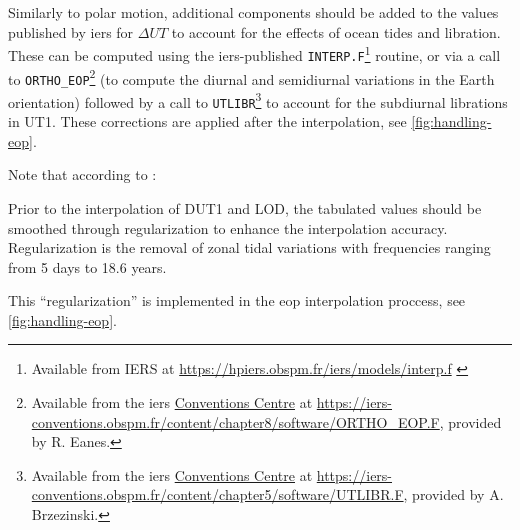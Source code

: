 Similarly to polar motion, additional components should 
be added to the values published by \gls{iers} for $\Delta UT$ to account for 
the effects of ocean tides and libration. These can be computed using the 
\gls{iers}-published \texttt{INTERP.F}\footnote{Available from IERS at \url{https://hpiers.obspm.fr/iers/models/interp.f} \label{fn:interp-f}} 
routine, or via a call to \texttt{ORTHO\_EOP}\footnote{Available from the \gls{iers} \href{https://iers-conventions.obspm.fr/}{Conventions Centre} at \url{https://iers-conventions.obspm.fr/content/chapter8/software/ORTHO_EOP.F}, provided by R. Eanes.} 
(to compute the diurnal and semidiurnal variations in the Earth orientation) 
followed by a call to \texttt{UTLIBR}\footnote{Available from the \gls{iers} \href{https://iers-conventions.obspm.fr/}{Conventions Centre} at \url{https://iers-conventions.obspm.fr/content/chapter5/software/UTLIBR.F}, provided by A. Brzezinski.\label{fn:utlibr-f}} 
to account for the subdiurnal librations in UT1. These corrections are applied 
after the interpolation, see \ref{fig:handling-eop}.

Note that according to \cite{Bradley2016}:
\begin{displayquote}
    Prior to the interpolation of DUT1 and LOD, the tabulated values
    should be smoothed through regularization to enhance the
    interpolation accuracy. Regularization is the removal of
    zonal tidal variations with frequencies ranging from 5 days
    to 18.6 years.
\end{displayquote}
This ``regularization'' is implemented in the \gls{eop} interpolation proccess, 
see \ref{fig:handling-eop}.

